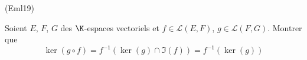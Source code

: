 \begin{tiny}(Eml19)\end{tiny} Soient $E$, $F$, $G$ des $\K$-espaces vectoriels et $f\in \mathcal{L}(E,F)$, $g\in \mathcal{L}(F,G)$. Montrer que
\begin{displaymath}
  \ker(g\circ f) = f^{-1}(\ker(g) \cap \Im(f)) = f^{-1}(\ker(g))
\end{displaymath}
